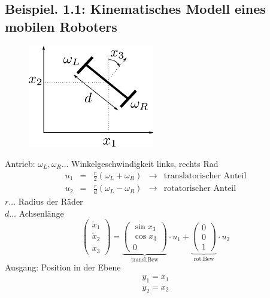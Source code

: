 \documentclass[ngerman]{tudscrreprt}
\begin{document}
\subsection*{\textbf{Beispiel}. 1.1: Kinematisches Modell eines mobilen Roboters}
\begin{figure}[H]
\centering
\def\svgwidth{200pt} 
  \includegraphics[width=5.5cm]{images/image2.pdf}
\end{figure}
Antrieb: $\omega_L, \omega_R \dots$ Winkelgeschwindigkeit links, rechts Rad
\begin{equation*}
\begin{matrix}
u_1 &=& \frac{r}{2}(\omega_L + \omega_R) &\to &\text{translatorischer Anteil}\\ 
u_2 &=& \frac{r}{d}(\omega_L - \omega_R) &\to &\text{rotatorischer Anteil}
\end{matrix}
\end{equation*}
$r\dots$  Radius der Räder\\ 
$d\dots$  Achsenlänge\\ 

\begin{equation*}
\begin{pmatrix}
\dot{x}_1 \\ 
\dot{x}_2\\ 
\dot x_3
\end{pmatrix}=
\underbrace{
\begin{pmatrix}
\sin{x_3} \\ 
\cos{x_3}\\ 
0
\end{pmatrix}}_{\text{transl.Bew}}\cdot u_1 + 
\underbrace{
\begin{pmatrix}
0\\ 0\\ 1
\end{pmatrix}}_{\text{rot.Bew}} \cdot u_2
\end{equation*}
Ausgang: Position in der Ebene
\begin{equation*}
\begin{matrix}
y_1 = x_1\\
y_2 = x_2
\end{matrix}
\end{equation*}
\end{document}
